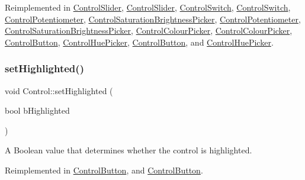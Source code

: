 Reimplemented in \hyperlink{classControlSlider_ad02c5f0f4382a9780f215e3568757c2b}{Control\+Slider}, \hyperlink{classControlSlider_aeb98aed4fbd48f28c55ac6eb7ffd9b30}{Control\+Slider}, \hyperlink{classControlSwitch_a47191d986db5cb5c95a7b2171d483784}{Control\+Switch}, \hyperlink{classControlSwitch_a6e27f98a50b25ba395f2ad7a5c1aa59f}{Control\+Switch}, \hyperlink{classControlPotentiometer_ac67b583a3a21f6c44ffcf57b41c33278}{Control\+Potentiometer}, \hyperlink{classControlSaturationBrightnessPicker_a4b71c4cd73bbe398460360121e88e657}{Control\+Saturation\+Brightness\+Picker}, \hyperlink{classControlPotentiometer_ac67b583a3a21f6c44ffcf57b41c33278}{Control\+Potentiometer}, \hyperlink{classControlSaturationBrightnessPicker_af272e7bef89c1bcf19354bfaa76ebcb2}{Control\+Saturation\+Brightness\+Picker}, \hyperlink{classControlColourPicker_a233d6048e0899b35f23aaa557a839069}{Control\+Colour\+Picker}, \hyperlink{classControlColourPicker_ac332c171d8aa481120139479c78da22b}{Control\+Colour\+Picker}, \hyperlink{classControlButton_ac3515c2c94586676696d73d48e5ab08f}{Control\+Button}, \hyperlink{classControlHuePicker_a2e6169e815f3ee9fa83f00f9e20f7292}{Control\+Hue\+Picker}, \hyperlink{classControlButton_ab8b40e3ef7dccccc2b2029c5ae113962}{Control\+Button}, and \hyperlink{classControlHuePicker_a45c6330610f27124057f4d69b37abc9b}{Control\+Hue\+Picker}.

\mbox{\label{classControl_a8bde57862133c06d64178fb1a0c31e8b}} 
\subsubsection{\texorpdfstring{set\+Highlighted()}{setHighlighted()}\hspace{0.1cm}{\footnotesize\ttfamily [1/2]}}
{\footnotesize\ttfamily void Control\+::set\+Highlighted (\begin{DoxyParamCaption}\item[{bool}]{b\+Highlighted }\end{DoxyParamCaption})\hspace{0.3cm}{\ttfamily [virtual]}}

A Boolean value that determines whether the control is highlighted. 

Reimplemented in \hyperlink{classControlButton_a534815c8b3462f04f39cfd1c2ba98645}{Control\+Button}, and \hyperlink{classControlButton_a463166812b3c42d952264855e2aa3b1d}{Control\+Button}.

